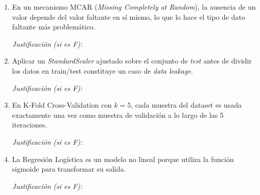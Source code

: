 \documentclass[11pt,a4paper]{article}
\begin{document}
\begin{enumerate}[label=\textbf{\arabic*.}, leftmargin=*, itemsep=18pt]

\item \underline{\hspace{1cm}} En un mecanismo MCAR (\textit{Missing Completely at Random}), la ausencia de un valor depende del valor faltante en s\'i mismo, lo que lo hace el tipo de dato faltante m\'as problem\'atico.

\vspace{0.5cm}
\noindent\textit{Justificaci\'on (si es F):} \underline{\hspace{12cm}}

\vspace{0.2cm}
\underline{\hspace{14cm}}

\item \underline{\hspace{1cm}} Aplicar un \textit{StandardScaler} ajustado sobre el conjunto de \textit{test} antes de dividir los datos en train/test constituye un caso de \textit{data leakage}.

\vspace{0.5cm}
\noindent\textit{Justificaci\'on (si es F):} \underline{\hspace{12cm}}

\vspace{0.2cm}
\underline{\hspace{14cm}}

\item \underline{\hspace{1cm}} En K-Fold Cross-Validation con $k=5$, cada muestra del dataset es usada exactamente una vez como muestra de validaci\'on a lo largo de las 5 iteraciones.

\vspace{0.5cm}
\noindent\textit{Justificaci\'on (si es F):} \underline{\hspace{12cm}}

\vspace{0.2cm}
\underline{\hspace{14cm}}

\item \underline{\hspace{1cm}} La Regresi\'on Log\'istica es un modelo no lineal porque utiliza la funci\'on sigmoide para transformar su salida.

\vspace{0.5cm}
\noindent\textit{Justificaci\'on (si es F):} \underline{\hspace{12cm}}


\end{enumerate}
\end{document}

